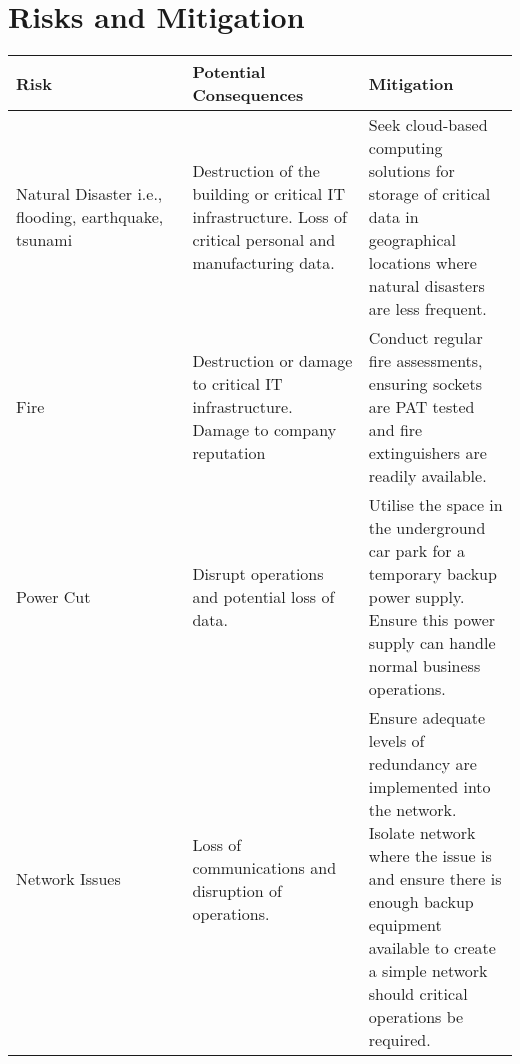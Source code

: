 \section{Risks and Mitigation}
\begin{table}[htp]
    \centering
    \begin{tabular}{|p{0.35\linewidth}|p{0.35\linewidth}|p{0.35\linewidth}|}
    \hline
    Risk                                                 & Potential Consequences                                                                                       & Mitigation                                                                                                                                                                                                                         \\ \hline
    Natural Disaster i.e., flooding, earthquake, tsunami & Destruction of the building or critical IT infrastructure. Loss of critical personal and manufacturing data. & Seek cloud-based computing solutions for storage of critical data in geographical locations where natural disasters are less frequent.                                                                                             \\ \hline
    Fire                                                 & Destruction or damage to critical IT infrastructure. Damage to company reputation                            & Conduct regular fire assessments, ensuring sockets are PAT tested and fire extinguishers are readily available.                                                                                                                    \\ \hline
    Power Cut                                            & Disrupt operations and potential loss of data.                                                               & Utilise the space in the underground car park for a temporary backup power supply. Ensure this power supply can handle normal business operations.                                                                                 \\ \hline
    Network Issues                                       & Loss of communications and disruption of operations.                                                         & Ensure adequate levels of redundancy are implemented into the network. Isolate network where the issue is and ensure there is enough backup equipment available to create a simple network should critical operations be required. \\ \hline

\end{tabular}
\end{table}
